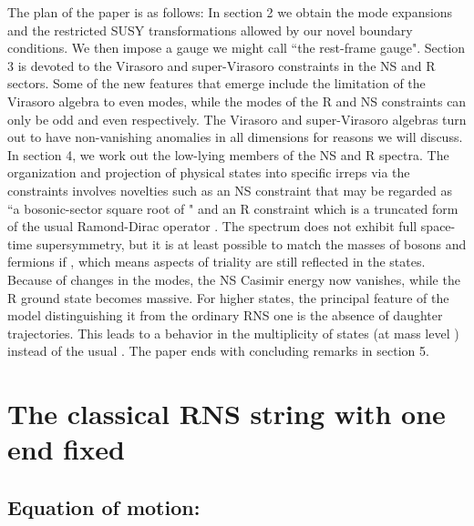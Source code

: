 \documentclass[a4paper,a4paper]{article}
\begin{document}
The plan of the paper is as follows: In section 2 we obtain the
mode expansions and the restricted SUSY transformations allowed by
our novel boundary conditions.  We then impose a gauge we might
call ``the rest-frame gauge". Section 3 is devoted to the Virasoro
and super-Virasoro constraints in the NS and R sectors.  Some of
the new features that emerge include the limitation of the
Virasoro algebra to even modes, while the modes of the R and NS
constraints can only be odd and even respectively. The
Virasoro and super-Virasoro algebras turn out to have
non-vanishing anomalies in all dimensions for reasons we will
discuss.  In section 4, we work out the low-lying members of the
NS and R spectra.  The organization and projection of physical
states into specific \coordHE{} irreps via the constraints involves
novelties such as an NS constraint that may be regarded as ``a
bosonic-sector square root of \coordHE{}" and an R constraint which is a
truncated form of the usual Ramond-Dirac operator \coordHE{}.  The
spectrum does not exhibit full space-time supersymmetry, but it is
at least possible to match the masses of bosons and fermions if
\coordHE{}, which means aspects of \coordHE{} triality are still
reflected in the states. Because of changes in the modes, the NS
Casimir energy now vanishes, while the R ground state becomes massive.
For higher states, the principal feature
of the model distinguishing it from the ordinary RNS one  is the absence of
daughter trajectories.  This leads to a \coordHE{} behavior in the
multiplicity of states (at mass level \coordHE{})  instead of
the usual \coordHE{}. The paper ends with concluding remarks in
section 5.



\section{The classical RNS string with one end fixed}
\subsection{Equation of motion:}
\end{document}
